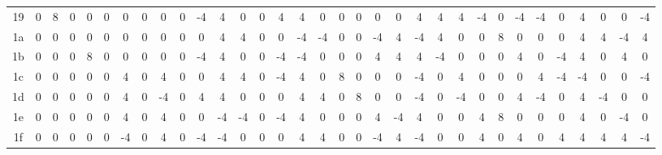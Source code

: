 \documentclass[11pt]{article}
\begin{document}
\begin{table}[htbp]
{\begin{tabular}{c|*{32}{c}}
    19 & 0 & 8 & 0 & 0 & 0 & 0 & 0 & 0 & 0 & -4 & 4 & 0 & 0 & 4 & 4 & 0 & 0 & 0 & 0 & 0 & 4 & 4 & 4 & -4 & 0 & -4 & -4 & 0 & 4 & 0 & 0 & -4 \\
    1a & 0 & 0 & 0 & 0 & 0 & 0 & 0 & 0 & 0 & 0 & 4 & 4 & 0 & 0 & -4 & -4 & 0 & 0 & -4 & 4 & -4 & 4 & 0 & 0 & 8 & 0 & 0 & 0 & 4 & 4 & -4 & 4 \\
    1b & 0 & 0 & 0 & 8 & 0 & 0 & 0 & 0 & 0 & -4 & 4 & 0 & 0 & -4 & -4 & 0 & 0 & 0 & 4 & 4 & 4 & -4 & 0 & 0 & 0 & 4 & 0 & -4 & 4 & 0 & 4 & 0 \\
    1c & 0 & 0 & 0 & 0 & 0 & 4 & 0 & 4 & 0 & 0 & 4 & 4 & 0 & -4 & 4 & 0 & 8 & 0 & 0 & 0 & -4 & 0 & 4 & 0 & 0 & 0 & 4 & -4 & -4 & 0 & 0 & -4 \\
    1d & 0 & 0 & 0 & 0 & 0 & 4 & 0 & -4 & 0 & 4 & 4 & 0 & 0 & 0 & 4 & 4 & 0 & 8 & 0 & 0 & -4 & 0 & -4 & 0 & 0 & 4 & -4 & 0 & 4 & -4 & 0 & 0 \\
    1e & 0 & 0 & 0 & 0 & 0 & 4 & 0 & 4 & 0 & 0 & -4 & -4 & 0 & -4 & 4 & 0 & 0 & 0 & 4 & -4 & 4 & 0 & 0 & 4 & 8 & 0 & 0 & 0 & 4 & 0 & -4 & 0 \\
    1f & 0 & 0 & 0 & 0 & 0 & -4 & 0 & 4 & 0 & -4 & -4 & 0 & 0 & 0 & 4 & 4 & 0 & 0 & -4 & 4 & -4 & 0 & 0 & 4 & 0 & 4 & 0 & 4 & 4 & 4 & 4 & -4 \\
\bottomrule
\end{tabular}
}
\end{table}
\end{document}
